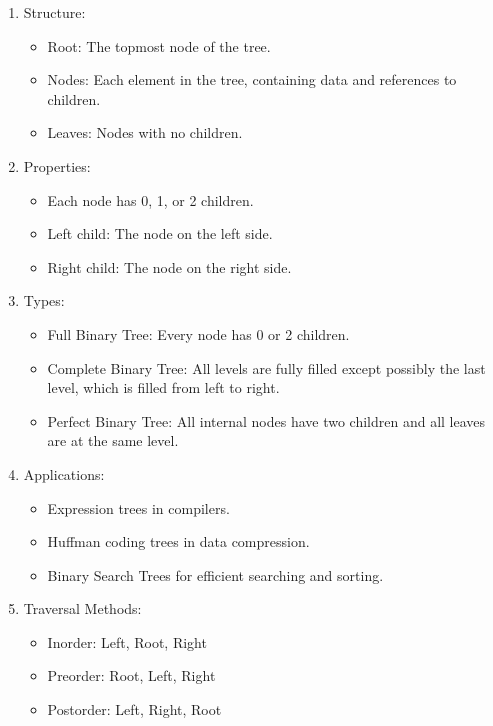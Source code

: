 \begin{enumerate}
\def\labelenumi{\arabic{enumi}.}
\tightlist
\item
  Structure:

  \begin{itemize}
  \tightlist
  \item
    Root: The topmost node of the tree.
  \item
    Nodes: Each element in the tree, containing data and references to
    children.
  \item
    Leaves: Nodes with no children.
  \end{itemize}
\item
  Properties:

  \begin{itemize}
  \tightlist
  \item
    Each node has 0, 1, or 2 children.
  \item
    Left child: The node on the left side.
  \item
    Right child: The node on the right side.
  \end{itemize}
\item
  Types:

  \begin{itemize}
  \tightlist
  \item
    Full Binary Tree: Every node has 0 or 2 children.
  \item
    Complete Binary Tree: All levels are fully filled except possibly
    the last level, which is filled from left to right.
  \item
    Perfect Binary Tree: All internal nodes have two children and all
    leaves are at the same level.
  \end{itemize}
\item
  Applications:

  \begin{itemize}
  \tightlist
  \item
    Expression trees in compilers.
  \item
    Huffman coding trees in data compression.
  \item
    Binary Search Trees for efficient searching and sorting.
  \end{itemize}
\item
  Traversal Methods:

  \begin{itemize}
  \tightlist
  \item
    Inorder: Left, Root, Right
  \item
    Preorder: Root, Left, Right
  \item
    Postorder: Left, Right, Root
  \end{itemize}
\end{enumerate}

